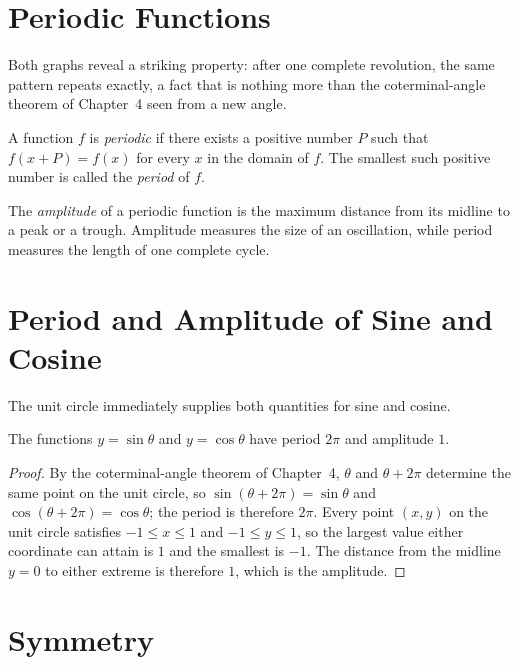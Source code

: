 \section{Periodic Functions}

Both graphs reveal a striking property: after one complete revolution, the
same pattern repeats exactly, a fact that is nothing more than the
coterminal-angle theorem of Chapter~4 seen from a new angle.

\begin{definition}
A function $f$ is \emph{periodic} if there exists a positive number $P$
such that $f(x+P) = f(x)$ for every $x$ in the domain of $f$. The smallest
such positive number is called the \emph{period} of $f$.
\end{definition}

\begin{definition}
The \emph{amplitude} of a periodic function is the maximum distance from
its midline to a peak or a trough. Amplitude measures the size of an
oscillation, while period measures the length of one complete cycle.
\end{definition}

\section{Period and Amplitude of Sine and Cosine}

The unit circle immediately supplies both quantities for sine and cosine.

\begin{theorem}
The functions $y = \sin\theta$ and $y = \cos\theta$ have period $2\pi$ and
amplitude $1$.
\end{theorem}

\begin{proof}
By the coterminal-angle theorem of Chapter~4, $\theta$ and $\theta + 2\pi$
determine the same point on the unit circle, so $\sin(\theta+2\pi) =
\sin\theta$ and $\cos(\theta+2\pi) = \cos\theta$; the period is therefore
$2\pi$. Every point $(x,y)$ on the unit circle satisfies $-1 \le x \le 1$
and $-1 \le y \le 1$, so the largest value either coordinate can attain is
$1$ and the smallest is $-1$. The distance from the midline $y=0$ to either
extreme is therefore $1$, which is the amplitude.
\end{proof}

\section{Symmetry}

